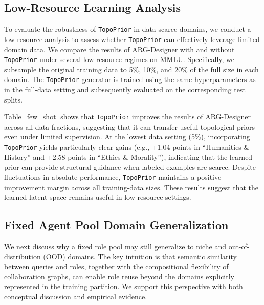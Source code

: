 \documentclass[lettersize,journal]{IEEEtran}
\theoremstyle{plain}
\begin{document}
\subsection{Low-Resource Learning Analysis}
\label{low_resource}
To evaluate the robustness of \texttt{TopoPrior} in data-scarce domains, we conduct a low-resource analysis to assess whether \texttt{TopoPrior} can effectively leverage limited domain data. We compare the results of ARG-Designer with and without \texttt{TopoPrior} under several low-resource regimes on MMLU. Specifically, we subsample the original training data to 5\%, 10\%, and 20\% of the full size in each domain. The \texttt{TopoPrior} generator is trained using the same hyperparameters as in the full-data setting and subsequently evaluated on the corresponding test splits.

Table~\ref{few_shot} shows that \texttt{TopoPrior} improves the results of ARG-Designer across all data fractions, suggesting that it can transfer useful topological priors even under limited supervision. At the lowest data setting (5\%), incorporating \texttt{TopoPrior} yields particularly clear gains (e.g., +1.04 points in ``Humanities \& History'' and +2.58 points in ``Ethics \& Morality''), indicating that the learned prior can provide structural guidance when labeled examples are scarce. Despite fluctuations in absolute performance, \texttt{TopoPrior} maintains a positive improvement margin across all training-data sizes. These results suggest that the learned latent space remains useful in low-resource settings.

\subsection{Fixed Agent Pool Domain Generalization}
\label{fixed_pool_sec}

We next discuss why a fixed role pool may still generalize to niche and out-of-distribution (OOD) domains. The key intuition is that semantic similarity between queries and roles, together with the compositional flexibility of collaboration graphs, can enable role reuse beyond the domains explicitly represented in the training partition. We support this perspective with both conceptual discussion and empirical evidence.
\end{document}

